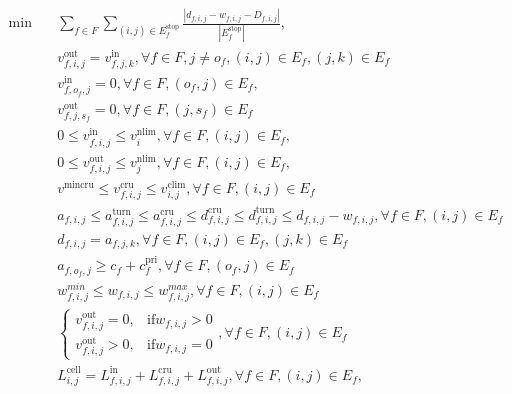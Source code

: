 \begin{align}
  \min\quad & \sum_{f \in F} \underset{\left(i , j\right) \in E_{f}^{\text{stop}}}{\sum} \frac{\left|d_{f , i , j} - w_{f , i , j} - D_{f , i , j}\right|}{\left|E_{f}^{\text{stop}}\right|} , \tag{eq\_0001} \\
  &  v_{f , i , j}^{\text{out}} = v_{f , j , k}^{\text{in}} , \forall f \in F , j \neq o_{f} , \left(i , j\right) \in E_{f} , \left(j , k\right) \in E_{f}  \tag{eq\_0002} \\
  &  v_{f , o_{f} , j}^{\text{in}} = 0 , \forall f \in F , \left(o_{f} , j\right) \in E_{f} ,  \tag{eq\_0003} \\
  &  v_{f , j , s_{f}}^{\text{out}} = 0 , \forall f \in F , \left(j , s_{f}\right) \in E_{f}  \tag{eq\_0004} \\
  &  0 \leq v_{f , i , j}^{\text{in}} \leq v_{i}^{\text{nlim}} , \forall f \in F , \left(i , j\right) \in E_{f} ,  \tag{eq\_0005} \\
  &  0 \leq v_{f , i , j}^{\text{out}} \leq v_{j}^{\text{nlim}} , \forall f \in F , \left(i , j\right) \in E_{f} ,  \tag{eq\_0006} \\
  &  v^{\text{mincru}} \leq v_{f , i , j}^{\text{cru}} \leq v_{i , j}^{\text{clim}} , \forall f \in F , \left(i , j\right) \in E_{f}  \tag{eq\_0007} \\
  &  a_{f , i , j} \leq a_{f , i , j}^{\text{turn}} \leq a_{f , i , j}^{\text{cru}} \leq d_{f , i , j}^{\text{cru}} \leq d_{f , i , j}^{\text{turn}} \leq d_{f , i , j} - w_{f , i , j} , \forall f \in F , \left(i , j\right) \in E_{f}  \tag{eq\_0008} \\
  &  d_{f , i , j} = a_{f , j , k} , \forall f \in F , \left(i , j\right) \in E_{f} , \left(j , k\right) \in E_{f}  \tag{eq\_0009} \\
  &  a_{f , o_{f} , j} \geq c_{f} + c_{f}^{\text{pri}} , \forall f \in F , \left(o_{f} , j\right) \in E_{f}  \tag{eq\_0010} \\
  &  w_{f , i , j}^{min} \leq w_{f , i , j} \leq w_{f , i , j}^{max} , \forall f \in F , \left(i , j\right) \in E_{f}  \tag{eq\_0011} \\
  &  \begin{cases} v_{f , i , j}^{\text{out}} = 0 , & \text{if} w_{f , i , j} > 0 \\ v_{f , i , j}^{\text{out}} > 0 , & \text{if} w_{f , i , j} = 0 \end{cases} , \forall f \in F , \left(i , j\right) \in E_{f}  \tag{eq\_0012} \\
  &  L_{i , j}^{\text{cell}} = L_{f , i , j}^{\text{in}} + L_{f , i , j}^{\text{cru}} + L_{f , i , j}^{\text{out}} , \forall f \in F , \left(i , j\right) \in E_{f} ,  \tag{eq\_0013} \\

\end{align}
